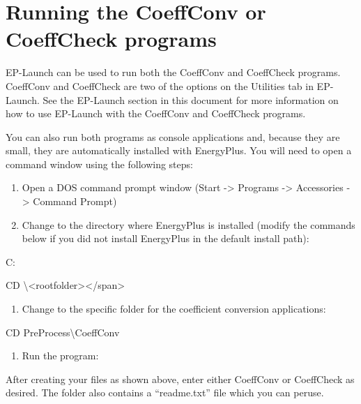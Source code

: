 \section{Running the CoeffConv or CoeffCheck programs}\label{running-the-coeffconv-or-coeffcheck-programs}

EP-Launch can be used to run both the CoeffConv and CoeffCheck programs. CoeffConv and CoeffCheck are two of the options on the Utilities tab in EP-Launch. See the EP-Launch section in this document for more information on how to use EP-Launch with the CoeffConv and CoeffCheck programs.

You can also run both programs as console applications and, because they are small, they are automatically installed with EnergyPlus. You will need to open a command window using the following steps:

\begin{enumerate}
\def\labelenumi{\arabic{enumi})}
\item
  Open a DOS command prompt window (Start -\textgreater{} Programs -\textgreater{} Accessories -\textgreater{} Command Prompt)
\item
  Change to the directory where EnergyPlus is installed (modify the commands below if you did not install EnergyPlus in the default install path):
\end{enumerate}

C:

CD \textbackslash{}\textless{}rootfolder\textgreater{}\textless{}/span\textgreater{}

\begin{enumerate}
\def\labelenumi{\arabic{enumi})}
\setcounter{enumi}{2}
\tightlist
\item
  Change to the specific folder for the coefficient conversion applications:
\end{enumerate}

CD PreProcess\textbackslash{}CoeffConv

\begin{enumerate}
\def\labelenumi{\arabic{enumi})}
\setcounter{enumi}{3}
\tightlist
\item
  Run the program:
\end{enumerate}

After creating your files as shown above, enter either CoeffConv or CoeffCheck as desired. The folder also contains a ``readme.txt'' file which you can peruse.
